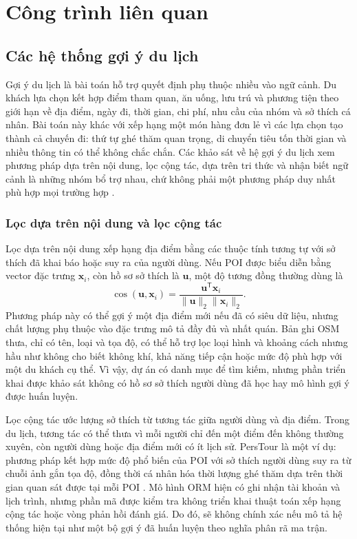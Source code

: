 \chapter{Công trình liên quan}
\label{chap:related_work}

\section{Các hệ thống gợi ý du lịch}

Gợi ý du lịch là bài toán hỗ trợ quyết định phụ thuộc nhiều vào ngữ cảnh. Du khách lựa chọn kết hợp điểm tham quan, ăn uống, lưu trú và phương tiện theo giới hạn về địa điểm, ngày đi, thời gian, chi phí, nhu cầu của nhóm và sở thích cá nhân. Bài toán này khác với xếp hạng một món hàng đơn lẻ vì các lựa chọn tạo thành cả chuyến đi: thứ tự ghé thăm quan trọng, di chuyển tiêu tốn thời gian và nhiều thông tin có thể không chắc chắn. Các khảo sát về hệ gợi ý du lịch xem phương pháp dựa trên nội dung, lọc cộng tác, dựa trên tri thức và nhận biết ngữ cảnh là những nhóm bổ trợ nhau, chứ không phải một phương pháp duy nhất phù hợp mọi trường hợp \cite{borras2014intelligent,gavalas2014mobile}.

\subsection{Lọc dựa trên nội dung và lọc cộng tác}

Lọc dựa trên nội dung xếp hạng địa điểm bằng các thuộc tính tương tự với sở thích đã khai báo hoặc suy ra của người dùng. Nếu POI được biểu diễn bằng vector đặc trưng $\mathbf{x}_i$, còn hồ sơ sở thích là $\mathbf{u}$, một độ tương đồng thường dùng là
\begin{equation}
    \operatorname{cos}(\mathbf{u},\mathbf{x}_i)
    = \frac{\mathbf{u}^{\mathsf T}\mathbf{x}_i}
    {\lVert\mathbf{u}\rVert_2\lVert\mathbf{x}_i\rVert_2}.
\end{equation}
Phương pháp này có thể gợi ý một địa điểm mới nếu đã có siêu dữ liệu, nhưng chất lượng phụ thuộc vào đặc trưng mô tả đầy đủ và nhất quán. Bản ghi OSM thưa, chỉ có tên, loại và tọa độ, có thể hỗ trợ lọc loại hình và khoảng cách nhưng hầu như không cho biết không khí, khả năng tiếp cận hoặc mức độ phù hợp với một du khách cụ thể. Vì vậy, dự án có danh mục để tìm kiếm, nhưng phần triển khai được khảo sát không có hồ sơ sở thích người dùng đã học hay mô hình gợi ý được huấn luyện.

Lọc cộng tác ước lượng sở thích từ tương tác giữa người dùng và địa điểm. Trong du lịch, tương tác có thể thưa vì mỗi người chỉ đến một điểm đến không thường xuyên, còn người dùng hoặc địa điểm mới có ít lịch sử. PersTour là một ví dụ: phương pháp kết hợp mức độ phổ biến của POI với sở thích người dùng suy ra từ chuỗi ảnh gắn tọa độ, đồng thời cá nhân hóa thời lượng ghé thăm dựa trên thời gian quan sát được tại mỗi POI \cite{lim2015persontour}. Mô hình ORM hiện có ghi nhận tài khoản và lịch trình, nhưng phần mã được kiểm tra không triển khai thuật toán xếp hạng cộng tác hoặc vòng phản hồi đánh giá. Do đó, sẽ không chính xác nếu mô tả hệ thống hiện tại như một bộ gợi ý đã huấn luyện theo nghĩa phân rã ma trận.

